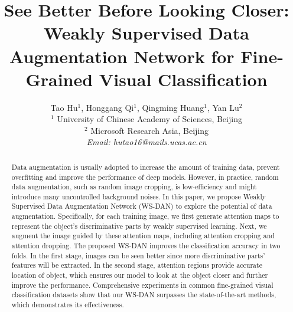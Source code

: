\documentclass[10pt,twocolumn,letterpaper]{article}
\begin{document}
\title{See Better Before Looking Closer: Weakly Supervised Data Augmentation Network for Fine-Grained Visual Classification}

\author{
Tao Hu$^1$, Honggang Qi$^1$, Qingming Huang$^1$, Yan Lu$^2$\\
$^1$ University of Chinese Academy of Sciences, Beijing\\
$^2$ Microsoft Research Asia, Beijing\\
\textit {Email: hutao16@mails.ucas.ac.cn}
}

\maketitle



\begin{abstract}
Data augmentation is usually adopted to increase the amount of training data, prevent overfitting and improve the performance of deep models. However, in practice, random data augmentation, such as random image cropping, is low-efficiency and might introduce many uncontrolled background noises. In this paper, we propose Weakly Supervised Data Augmentation Network (WS-DAN) to explore the potential of data augmentation. Specifically, for each training image, we first generate attention maps to represent the object's discriminative parts by weakly supervised learning. Next, we augment the image guided by these attention maps, including attention cropping and attention dropping. The proposed WS-DAN improves the classification accuracy in two folds. In the first stage, images can be seen better since more discriminative parts' features will be extracted. In the second stage, attention regions provide accurate location of object, which ensures our model to look at the object closer and further improve the performance. Comprehensive experiments in common fine-grained visual classification datasets show that our WS-DAN surpasses the state-of-the-art methods, which demonstrates its effectiveness.
\end{abstract}
\end{document}
